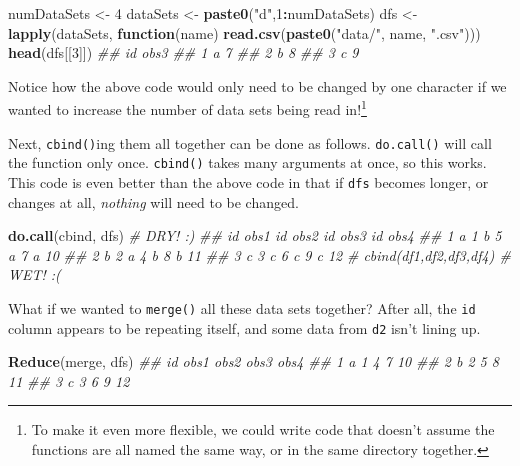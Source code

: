 \documentclass[12pt,krantz2]{krantz}
\makeatletter
\newenvironment{Shaded}{\begin{snugshade}}{\end{snugshade}}
\newcommand{\CommentTok}[1]{\textcolor[rgb]{0.37,0.37,0.37}{\textit{#1}}}
\newcommand{\ControlFlowTok}[1]{\textcolor[rgb]{0.27,0.27,0.27}{\textbf{#1}}}
\newcommand{\DecValTok}[1]{\textcolor[rgb]{0.06,0.06,0.06}{#1}}
\newcommand{\KeywordTok}[1]{\textcolor[rgb]{0.27,0.27,0.27}{\textbf{#1}}}
\newcommand{\NormalTok}[1]{#1}
\newcommand{\OperatorTok}[1]{\textcolor[rgb]{0.43,0.43,0.43}{\textbf{#1}}}
\newcommand{\StringTok}[1]{\textcolor[rgb]{0.5,0.5,0.5}{#1}}
\newenvironment{kframe}{%
\medskip{}
\setlength{\fboxsep}{.8em}
 \def\at@end@of@kframe{}%
 \ifinner\ifhmode%
  \def\at@end@of@kframe{\end{minipage}}%
  \begin{minipage}{\columnwidth}%
 \fi\fi%
 \def\FrameCommand##1{\hskip\@totalleftmargin \hskip-\fboxsep
 \colorbox{shadecolor}{##1}\hskip-\fboxsep
     \hskip-\linewidth \hskip-\@totalleftmargin \hskip\columnwidth}%
 \MakeFramed {\advance\hsize-\width
   \@totalleftmargin\z@ \linewidth\hsize
   \@setminipage}}%
 {\par\unskip\endMakeFramed%
 \at@end@of@kframe}
\renewenvironment{Shaded}{\begin{kframe}}{\end{kframe}}
\makeatother
\begin{document}
\begin{Shaded}
\begin{Highlighting}[]
\NormalTok{numDataSets <-}\StringTok{ }\DecValTok{4}
\NormalTok{dataSets <-}\StringTok{ }\KeywordTok{paste0}\NormalTok{(}\StringTok{"d"}\NormalTok{,}\DecValTok{1}\OperatorTok{:}\NormalTok{numDataSets)}
\NormalTok{dfs <-}\StringTok{ }\KeywordTok{lapply}\NormalTok{(dataSets, }
              \ControlFlowTok{function}\NormalTok{(name) }\KeywordTok{read.csv}\NormalTok{(}\KeywordTok{paste0}\NormalTok{(}\StringTok{"data/"}\NormalTok{, name, }\StringTok{".csv"}\NormalTok{)))}
\KeywordTok{head}\NormalTok{(dfs[[}\DecValTok{3}\NormalTok{]])}
\CommentTok{##   id obs3}
\CommentTok{## 1  a    7}
\CommentTok{## 2  b    8}
\CommentTok{## 3  c    9}
\end{Highlighting}
\end{Shaded}

Notice how the above code would only need to be changed by one character if we wanted to increase the number of data sets being read in!\footnote{To make it even more flexible, we could write code that doesn't assume the functions are all named the same way, or in the same directory together.}

Next, \texttt{cbind()}ing them all together can be done as follows. \texttt{do.call()} will call the function only once. \texttt{cbind()} takes many arguments at once, so this works. This code is even better than the above code in that if \texttt{dfs} becomes longer, or changes at all, \emph{nothing} will need to be changed.

\begin{Shaded}
\begin{Highlighting}[]
\KeywordTok{do.call}\NormalTok{(cbind, dfs) }\CommentTok{# DRY! :)}
\CommentTok{##   id obs1 id obs2 id obs3 id obs4}
\CommentTok{## 1  a    1  b    5  a    7  a   10}
\CommentTok{## 2  b    2  a    4  b    8  b   11}
\CommentTok{## 3  c    3  c    6  c    9  c   12}
\CommentTok{# cbind(df1,df2,df3,df4) # WET! :(}
\end{Highlighting}
\end{Shaded}

What if we wanted to \texttt{merge()} all these data sets together? After all, the \texttt{id} column appears to be repeating itself, and some data from \texttt{d2} isn't lining up.

\begin{Shaded}
\begin{Highlighting}[]
\KeywordTok{Reduce}\NormalTok{(merge, dfs)}
\CommentTok{##   id obs1 obs2 obs3 obs4}
\CommentTok{## 1  a    1    4    7   10}
\CommentTok{## 2  b    2    5    8   11}
\CommentTok{## 3  c    3    6    9   12}
\end{Highlighting}
\end{Shaded}
\end{document}
